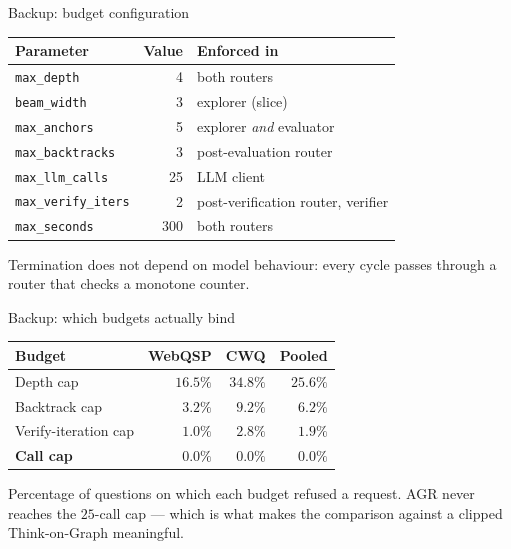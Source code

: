
\begin{frame}{Backup: budget configuration}
  \begin{table}
    \small
    \begin{tabular}{@{}lrL{52mm}@{}}
      \toprule
      \textbf{Parameter} & \textbf{Value} & \textbf{Enforced in} \\
      \midrule
      \texttt{max\_depth}        & 4 & both routers \\
      \texttt{beam\_width}       & 3 & explorer (slice) \\
      \texttt{max\_anchors}      & 5 & explorer \emph{and} evaluator \\
      \texttt{max\_backtracks}   & 3 & post-evaluation router \\
      \texttt{max\_llm\_calls}   & 25 & LLM client \\
      \texttt{max\_verify\_iters}& 2 & post-verification router, verifier \\
      \texttt{max\_seconds}      & 300 & both routers \\
      \bottomrule
    \end{tabular}
  \end{table}
  {\small Termination does not depend on model behaviour: every cycle passes
  through a router that checks a monotone counter.}
\end{frame}

\begin{frame}{Backup: which budgets actually bind}
  \begin{table}
    \small
    \begin{tabular}{@{}lrrr@{}}
      \toprule
      \textbf{Budget} & \textbf{WebQSP} & \textbf{CWQ} & \textbf{Pooled} \\
      \midrule
      Depth cap        & $16.5\%$ & $34.8\%$ & $25.6\%$ \\
      Backtrack cap    & $3.2\%$  & $9.2\%$  & $6.2\%$ \\
      Verify-iteration cap & $1.0\%$ & $2.8\%$ & $1.9\%$ \\
      \textbf{Call cap} & $\mathbf{0.0\%}$ & $\mathbf{0.0\%}$
                        & $\mathbf{0.0\%}$ \\
      \bottomrule
    \end{tabular}
  \end{table}
  {\small Percentage of questions on which each budget refused a request.
  AGR never reaches the $25$-call cap --- which is what makes the comparison
  against a clipped Think-on-Graph meaningful.}
\end{frame}

